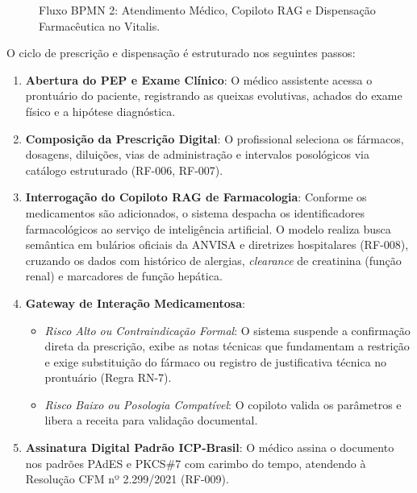 \begin{figure}[H]
{%
}
\caption{Fluxo BPMN 2: Atendimento Médico, Copiloto RAG e Dispensação Farmacêutica no Vitalis.}
\label{fig:bpmn_fluxo2}
\end{figure}

O ciclo de prescrição e dispensação é estruturado nos seguintes passos:
\begin{enumerate}[leftmargin=*]
    \item \textbf{Abertura do PEP e Exame Clínico}: O médico assistente acessa o prontuário do paciente, registrando as queixas evolutivas, achados do exame físico e a hipótese diagnóstica.
    \item \textbf{Composição da Prescrição Digital}: O profissional seleciona os fármacos, dosagens, diluições, vias de administração e intervalos posológicos via catálogo estruturado (RF-006, RF-007).
    \item \textbf{Interrogação do Copiloto RAG de Farmacologia}: Conforme os medicamentos são adicionados, o sistema despacha os identificadores farmacológicos ao serviço de inteligência artificial. O modelo realiza busca semântica em bulários oficiais da ANVISA e diretrizes hospitalares \cite{lewis_rag:2020} (RF-008), cruzando os dados com histórico de alergias, \textit{clearance} de creatinina (função renal) e marcadores de função hepática.
    \item \textbf{Gateway de Interação Medicamentosa}:
    \begin{itemize}
        \item \textit{Risco Alto ou Contraindicação Formal}: O sistema suspende a confirmação direta da prescrição, exibe as notas técnicas que fundamentam a restrição e exige substituição do fármaco ou registro de justificativa técnica no prontuário (Regra RN-7).
        \item \textit{Risco Baixo ou Posologia Compatível}: O copiloto valida os parâmetros e libera a receita para validação documental.
    \end{itemize}
    \item \textbf{Assinatura Digital Padrão ICP-Brasil}: O médico assina o documento nos padrões PAdES e PKCS\#7 com carimbo do tempo, atendendo à Resolução CFM nº 2.299/2021 \cite{cfm_digital:2021} (RF-009).

\end{enumerate}
